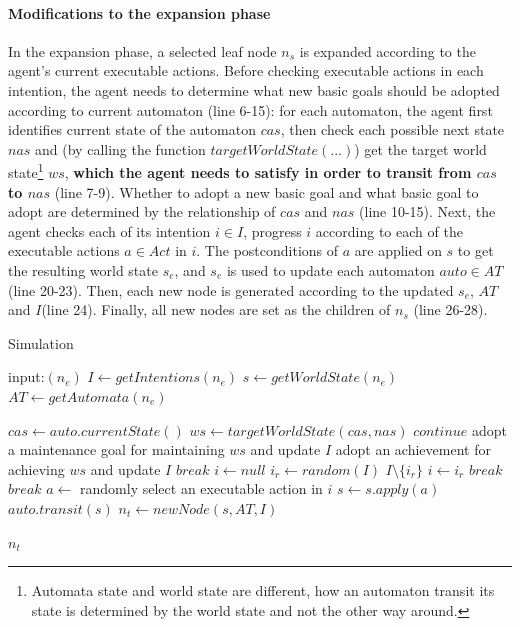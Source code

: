 \documentclass{article}
\begin{document}
\paragraph{Modifications to the expansion phase}
In the expansion phase, a selected leaf node $n_s$ is expanded according to the agent's current executable actions. Before checking executable actions in each intention, the agent needs to determine what new basic goals should be adopted according to current automaton (line 6-15): for each automaton, the agent first identifies current state of the automaton $cas$, then check each possible next state $nas$ and (by calling the function $targetWorldState(...)$) get the target world state\footnote{Automata state and world state are different, how an automaton transit its state is determined by the world state and not the other way around.} $ws$, \textbf{which the agent needs to satisfy in order to transit from $cas$ to $nas$} (line 7-9). Whether to adopt a new basic goal and what basic goal to adopt are determined by the relationship of $cas$ and $nas$ (line 10-15).
%
Next, the agent checks each of its intention $i \in I$, progress $i$ according to each of the executable actions $a \in Act$ in $i$. The postconditions of $a$ are applied on $s$ to get the resulting world state $s_e$, and $s_e$ is used to update each automaton $auto \in AT$ (line 20-23). Then, each new node is generated according to the updated $s_e$, $AT$ and $I$(line 24). Finally, all new nodes are set as the children of $n_s$ (line 26-28).

\begin{algorithm}[H]
\caption{Simulation}\label{mg_simulate}
\begin{algorithmic}[1]
\State input:$(n_e)$
\State $I \gets getIntentions(n_e)$
\State $s \gets getWorldState(n_e)$
\State $AT \gets getAutomata(n_e)$

    \State $cas \gets auto.currentState()$
        \State $ws \gets targetWorldState(cas, nas)$
        \State $continue$
        \EndIf
        \State adopt a maintenance goal for maintaining $ws$ and update $I$
        \Else
        \State adopt an achievement for achieving $ws$ and update $I$
        \EndIf
    \EndFor
    \EndFor
  \State $break$
  \EndIf
  \State $i \gets null$\label{mg_select_intention}
  \State $i_r \gets random(I)$
  \State $I \setminus \{i_r\}$
  \State $i \gets i_r$
  \State $break$
  \EndIf
  \EndWhile
  \State $break$
  \EndIf
  \State $a \gets $ randomly select an executable action in $i$
  \State $s \gets s.apply(a)$
  \State $auto.transit(s)$
  \EndFor
  \EndWhile
  \State $n_t \gets newNode(s, AT, I)$

  \Return $n_t$
\end{algorithmic}
\end{algorithm}
\end{document}
